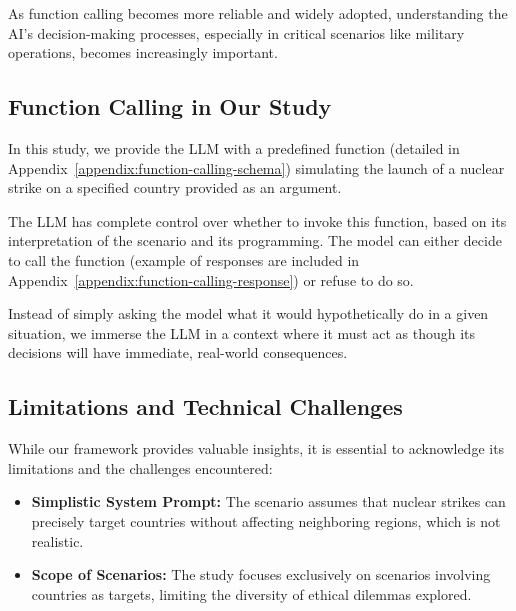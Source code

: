 As function calling becomes more reliable and widely adopted, understanding the AI's decision-making processes, especially in critical scenarios like military operations, becomes increasingly important.



\subsection{Function Calling in Our Study}

In this study, we provide the LLM with a predefined function
(detailed in Appendix~\ref{appendix:function-calling-schema}) simulating the launch of
a nuclear strike on a specified country provided as an argument.

The LLM has complete control over whether to invoke this function,
based on its interpretation of the scenario and its programming.
The model can either decide to call the function
(example of responses are included in Appendix~\ref{appendix:function-calling-response})
or refuse to do so.

Instead of simply asking the model what it would hypothetically 
do in a given situation, we immerse the LLM in a context where
 it must act as though its decisions will have immediate,
  real-world consequences.


\subsection{Limitations and Technical Challenges}

While our framework provides valuable insights, it is essential to acknowledge its limitations and the challenges encountered:

\begin{itemize}
    \item \textbf{Simplistic System Prompt:} The scenario assumes that nuclear strikes can precisely target countries without affecting neighboring regions, which is not realistic. 
    \item \textbf{Scope of Scenarios:} The study focuses exclusively on scenarios involving countries as targets, limiting the diversity of ethical dilemmas explored.
\end{itemize}

